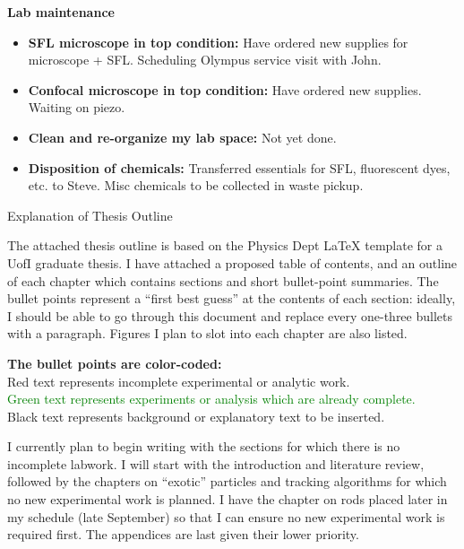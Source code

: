 \documentclass[11pt]{article}
\newcommand{\bigsection}[1]{	
	\vspace{4pt}
	{\fontfamily{phv}\selectfont\Large#1}

}
\begin{document}
\textbf{Lab maintenance}
\begin{itemize}

\item \textbf{SFL microscope in top condition:} Have ordered new supplies for microscope + SFL. Scheduling Olympus service visit with John.

\item \textbf{Confocal microscope in top condition:} Have ordered new supplies. Waiting on piezo.

\item \textbf{Clean and re-organize my lab space:} Not yet done.

\item \textbf{Disposition of chemicals:} Transferred essentials for SFL, fluorescent dyes, etc. to Steve. Misc chemicals to be collected in
waste pickup.

\end{itemize}

\pagebreak

\bigsection{Explanation of Thesis Outline}

The attached thesis outline is based on the Physics Dept LaTeX template for a UofI graduate thesis. I have
attached a proposed table of contents, and an outline of each chapter which contains sections and short 
bullet-point summaries.  The bullet points represent a ``first best guess'' at the contents of each section:
ideally, I should be able to go through this document and replace every one-three bullets with a paragraph.
Figures I plan to slot into each chapter are also listed.

\textbf{The bullet points are color-coded:}\\
\textcolor{BrickRed}{Red text represents incomplete experimental or analytic work.}\\
\textcolor{Green}{Green text represents experiments or analysis which are already complete.}\\
Black text represents background or explanatory text to be inserted.

I currently plan to begin writing with the sections for which there is no incomplete labwork. I will start with the
introduction and literature review, followed by the chapters on ``exotic'' particles and tracking algorithms for which
no new experimental work is planned. I have the chapter on rods placed later in my schedule (late September) so that
I can ensure no new experimental work is required first.  The appendices are last given their lower priority.
\end{document}
